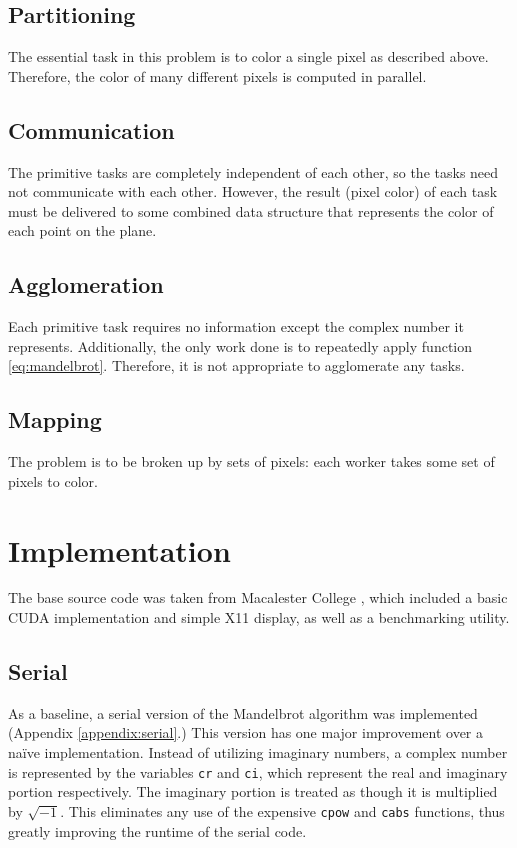 \documentclass{article}
\begin{document}
    \subsection{Partitioning}
        The essential task in this problem is to color a single pixel as described above. Therefore, the color of many different pixels is computed in parallel.

    \subsection{Communication}
        The primitive tasks are completely independent of each other, so the tasks need not communicate with each other. However, the result (pixel color) of each task must be delivered to some combined data structure that represents the color of each point on the plane.

    \subsection{Agglomeration}
        Each primitive task requires no information except the complex number it represents. Additionally, the only work done is to repeatedly apply function \ref{eq:mandelbrot}. Therefore, it is not appropriate to agglomerate any tasks.

    \subsection{Mapping}
        The problem is to be broken up by sets of pixels: each worker takes some set of pixels to color.


\section{Implementation} \label{sec:impl}
    The base source code was taken from Macalester College \cite{mandel_orig}, which included a basic CUDA implementation and simple X11 display, as well as a benchmarking utility.

    \subsection{Serial}
        As a baseline, a serial version of the Mandelbrot algorithm was implemented (Appendix \ref{appendix:serial}.) This version has one major improvement over a na\"ive implementation. Instead of utilizing imaginary numbers, a complex number is represented by the variables \verb|cr| and \verb|ci|, which represent the real and imaginary portion respectively. The imaginary portion is treated as though it is multiplied by $\sqrt{-1}$. This eliminates any use of the expensive \verb|cpow| and \verb|cabs| functions, thus greatly improving the runtime of the serial code.
\end{document}
